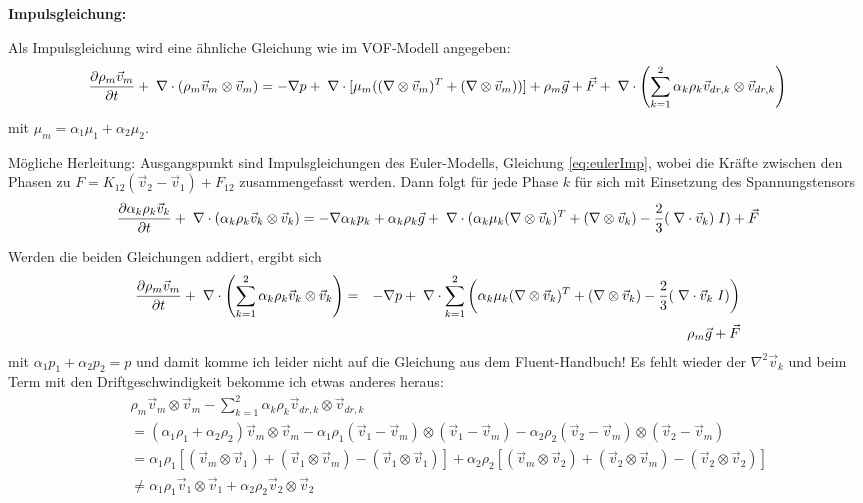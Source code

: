 {\bf Impulsgleichung:}

Als Impulsgleichung wird eine ähnliche Gleichung wie im VOF-Modell
angegeben: 
\begin{equation}
\frac{\partial \rho_m \vec{v}_m}{\partial t} + \;\nabla \cdot \left(\rho_m
\vec{v}_m\otimes\vec{v}_m\right) = - \nabla p + \;\nabla \cdot [\mu_m (( \nabla
  \otimes \vec{v}_m)^T + (\nabla \otimes \vec{v}_m))] + \rho_m \vec{g}
+ \vec{F} + \;\nabla \cdot \left(\sum_{k=1}^2\alpha_k\rho_k
\vec{v}_{dr,k}\otimes\vec{v}_{dr,k}\right)\label{eq:fluent-mixed-impuls}
\end{equation}
mit $\mu_m = \alpha_1 \mu_1 + \alpha_2 \mu_2$.


Mögliche Herleitung: Ausgangspunkt sind Impulsgleichungen des
Euler-Modells, Gleichung \ref{eq:eulerImp}, wobei die Kräfte zwischen
den Phasen zu $F = K_{12} (\vec{v}_2 - \vec{v}_1) + F_{12}$
zusammengefasst werden. Dann folgt für jede Phase $k$ für sich mit
Einsetzung des Spannungstensors
\[
\frac{\partial \alpha_k \rho_k \vec{v}_k}{\partial t} + \;\nabla \cdot
(\alpha_k\rho_k \vec{v}_k\otimes\vec{v}_k) = - \nabla \alpha_k p_k +
\alpha_k\rho_k \vec{g} + \;\nabla \cdot (\alpha_k 
\mu_k ( \nabla \otimes \vec{v}_k)^T + (\nabla \otimes \vec{v}_k) -
\frac{2}{3} (\;\nabla \cdot \vec{v}_k)\; I ) + \vec{F}
\]

Werden die beiden Gleichungen addiert, ergibt sich
\begin{eqnarray*}
\frac{\partial \rho_m \vec{v}_m}{\partial t} + \;\nabla \cdot
\left(\sum_{k=1}^2\alpha_k\rho_k \vec{v}_k\otimes\vec{v}_k\right)
&=& -
\nabla p + \;\nabla \cdot \sum_{k=1}^2 \left(\alpha_k \mu_k (
\nabla \otimes \vec{v}_k)^T + (\nabla \otimes \vec{v}_k) - \frac{2}{3}
(\;\nabla \cdot \vec{v}_k\; I )\right)\\
&&
\rho_m \vec{g} + \vec{F}
\end{eqnarray*}
mit $\alpha_1 p_1 + \alpha_2 p_2 = p$ und damit komme ich leider nicht
auf die Gleichung aus dem Fluent-Handbuch!  Es fehlt wieder der
$\nabla^2 \vec{v}_k$ und beim Term mit den Driftgeschwindigkeit
bekomme ich etwas anderes heraus:
\begin{eqnarray*}
&& \rho_m \vec{v}_m\otimes\vec{v}_m - \sum_{k=1}^2\alpha_k\rho_k
\vec{v}_{dr,k}\otimes\vec{v}_{dr,k} \\
&& =(\alpha_1\rho_1+\alpha_2\rho_2)\vec{v}_m\otimes\vec{v}_m -
\alpha_1\rho_1 (\vec{v}_1-\vec{v}_m)\otimes( \vec{v}_1-\vec{v}_m) -
\alpha_2\rho_2 (\vec{v}_2-\vec{v}_m)\otimes( \vec{v}_2-\vec{v}_m) \\
&& = \alpha_1\rho_1 [(\vec{v}_m\otimes\vec{v}_1) +
                     (\vec{v}_1\otimes\vec{v}_m) -
                     (\vec{v}_1\otimes\vec{v}_1)] +
     \alpha_2\rho_2 [(\vec{v}_m\otimes\vec{v}_2) +
                     (\vec{v}_2\otimes\vec{v}_m) -
                     (\vec{v}_2\otimes\vec{v}_2)]\\
&& \neq
\alpha_1\rho_1 \vec{v}_1\otimes\vec{v}_1 +
\alpha_2\rho_2 \vec{v}_2\otimes\vec{v}_2
\end{eqnarray*}

